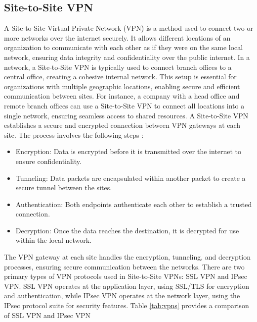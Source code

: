 \documentclass[12pt]{report}
\begin{document}
\subsection{Site-to-Site VPN}
A Site-to-Site Virtual Private Network (VPN) is a method used to connect two or more networks over the internet securely. It allows different locations of an organization to communicate with each other as if they were on the same local network, ensuring data integrity and confidentiality over the public internet.
In a network, a Site-to-Site VPN is typically used to connect branch offices to a central office, creating a cohesive internal network. This setup is essential for organizations with multiple geographic locations, enabling secure and efficient communication between sites. For instance, a company with a head office and remote branch offices can use a Site-to-Site VPN to connect all locations into a single network, ensuring seamless access to shared resources.
A Site-to-Site VPN establishes a secure and encrypted connection between VPN gateways at each site. The process involves the following steps \cite{Site2Site}:
\begin{itemize}
    \item Encryption: Data is encrypted before it is transmitted over the internet to ensure confidentiality.
    \item Tunneling: Data packets are encapsulated within another packet to create a secure tunnel between the sites.
    \item Authentication: Both endpoints authenticate each other to establish a trusted connection.
    \item Decryption: Once the data reaches the destination, it is decrypted for use within the local network.
\end{itemize}
The VPN gateway at each site handles the encryption, tunneling, and decryption processes, ensuring secure communication between the networks.
There are two primary types of VPN protocols used in Site-to-Site VPNs: SSL VPN and IPsec VPN. SSL VPN operates at the application layer, using SSL/TLS for encryption and authentication, while IPsec VPN operates at the network layer, using the IPsec protocol suite for security features. Table \ref{tab:vpns} provides a comparison of SSL VPN and IPsec VPN \cite{IPSec} \cite{IPSecvsSSL} 
\end{document}
